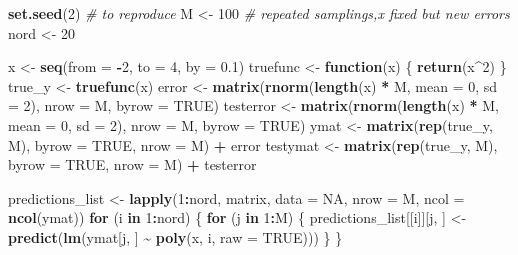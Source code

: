 \documentclass[
]{article}
\newenvironment{Shaded}{\begin{snugshade}}{\end{snugshade}}
\newcommand{\AttributeTok}[1]{\textcolor[rgb]{0.13,0.29,0.53}{#1}}
\newcommand{\CommentTok}[1]{\textcolor[rgb]{0.56,0.35,0.01}{\textit{#1}}}
\newcommand{\ConstantTok}[1]{\textcolor[rgb]{0.56,0.35,0.01}{#1}}
\newcommand{\ControlFlowTok}[1]{\textcolor[rgb]{0.13,0.29,0.53}{\textbf{#1}}}
\newcommand{\DecValTok}[1]{\textcolor[rgb]{0.00,0.00,0.81}{#1}}
\newcommand{\FloatTok}[1]{\textcolor[rgb]{0.00,0.00,0.81}{#1}}
\newcommand{\FunctionTok}[1]{\textcolor[rgb]{0.13,0.29,0.53}{\textbf{#1}}}
\newcommand{\NormalTok}[1]{#1}
\newcommand{\OtherTok}[1]{\textcolor[rgb]{0.56,0.35,0.01}{#1}}
\newcommand{\SpecialCharTok}[1]{\textcolor[rgb]{0.81,0.36,0.00}{\textbf{#1}}}
\begin{document}
\begin{Shaded}
\begin{Highlighting}[]
\FunctionTok{set.seed}\NormalTok{(}\DecValTok{2}\NormalTok{) }\CommentTok{\# to reproduce}
\NormalTok{M }\OtherTok{\textless{}{-}} \DecValTok{100} \CommentTok{\# repeated samplings,x fixed but new errors}
\NormalTok{nord }\OtherTok{\textless{}{-}} \DecValTok{20}

\NormalTok{x }\OtherTok{\textless{}{-}} \FunctionTok{seq}\NormalTok{(}\AttributeTok{from =} \SpecialCharTok{{-}}\DecValTok{2}\NormalTok{, }\AttributeTok{to =} \DecValTok{4}\NormalTok{, }\AttributeTok{by =} \FloatTok{0.1}\NormalTok{)}
\NormalTok{truefunc }\OtherTok{\textless{}{-}} \ControlFlowTok{function}\NormalTok{(x) \{}
  \FunctionTok{return}\NormalTok{(x}\SpecialCharTok{\^{}}\DecValTok{2}\NormalTok{)}
\NormalTok{\}}
\NormalTok{true\_y }\OtherTok{\textless{}{-}} \FunctionTok{truefunc}\NormalTok{(x)}
\NormalTok{error }\OtherTok{\textless{}{-}} \FunctionTok{matrix}\NormalTok{(}\FunctionTok{rnorm}\NormalTok{(}\FunctionTok{length}\NormalTok{(x) }\SpecialCharTok{*}\NormalTok{ M, }\AttributeTok{mean =} \DecValTok{0}\NormalTok{, }\AttributeTok{sd =} \DecValTok{2}\NormalTok{), }\AttributeTok{nrow =}\NormalTok{ M, }\AttributeTok{byrow =} \ConstantTok{TRUE}\NormalTok{)}
\NormalTok{testerror }\OtherTok{\textless{}{-}} \FunctionTok{matrix}\NormalTok{(}\FunctionTok{rnorm}\NormalTok{(}\FunctionTok{length}\NormalTok{(x) }\SpecialCharTok{*}\NormalTok{ M, }\AttributeTok{mean =} \DecValTok{0}\NormalTok{, }\AttributeTok{sd =} \DecValTok{2}\NormalTok{), }\AttributeTok{nrow =}\NormalTok{ M, }\AttributeTok{byrow =} \ConstantTok{TRUE}\NormalTok{)}
\NormalTok{ymat }\OtherTok{\textless{}{-}} \FunctionTok{matrix}\NormalTok{(}\FunctionTok{rep}\NormalTok{(true\_y, M), }\AttributeTok{byrow =} \ConstantTok{TRUE}\NormalTok{, }\AttributeTok{nrow =}\NormalTok{ M) }\SpecialCharTok{+}\NormalTok{ error}
\NormalTok{testymat }\OtherTok{\textless{}{-}} \FunctionTok{matrix}\NormalTok{(}\FunctionTok{rep}\NormalTok{(true\_y, M), }\AttributeTok{byrow =} \ConstantTok{TRUE}\NormalTok{, }\AttributeTok{nrow =}\NormalTok{ M) }\SpecialCharTok{+}\NormalTok{ testerror}

\NormalTok{predictions\_list }\OtherTok{\textless{}{-}} \FunctionTok{lapply}\NormalTok{(}\DecValTok{1}\SpecialCharTok{:}\NormalTok{nord, matrix, }\AttributeTok{data =} \ConstantTok{NA}\NormalTok{, }\AttributeTok{nrow =}\NormalTok{ M, }\AttributeTok{ncol =} \FunctionTok{ncol}\NormalTok{(ymat))}
\ControlFlowTok{for}\NormalTok{ (i }\ControlFlowTok{in} \DecValTok{1}\SpecialCharTok{:}\NormalTok{nord) \{}
  \ControlFlowTok{for}\NormalTok{ (j }\ControlFlowTok{in} \DecValTok{1}\SpecialCharTok{:}\NormalTok{M) \{}
\NormalTok{    predictions\_list[[i]][j, ] }\OtherTok{\textless{}{-}} \FunctionTok{predict}\NormalTok{(}\FunctionTok{lm}\NormalTok{(ymat[j, ] }\SpecialCharTok{\textasciitilde{}} \FunctionTok{poly}\NormalTok{(x, i, }\AttributeTok{raw =} \ConstantTok{TRUE}\NormalTok{)))}
\NormalTok{  \}}
\NormalTok{\}}


\end{Highlighting}
\end{Shaded}
\end{document}

